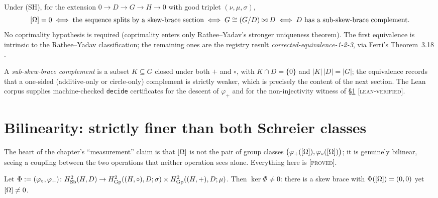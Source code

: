 \begin{theorem}\label{thm:identify}
Under (SH), for the extension $0\to D\to G\to H\to0$ with good triplet
$(\nu,\mu,\sigma)$,
\[
  [\Omega]=0
  \iff \text{the sequence splits by a skew-brace section}
  \iff G\cong (G/D)\bowtie D
  \iff D \text{ has a sub-skew-brace complement.}
\]
No coprimality hypothesis is required (coprimality enters only Rathee--Yadav's
stronger uniqueness theorem). The first equivalence is intrinsic to the
Rathee--Yadav classification; the remaining ones are the registry result
\emph{corrected-equivalence-1-2-3}, via Ferri's Theorem~3.18 \cite{ferri-qsb}.
\end{theorem}

A \emph{sub-skew-brace complement} is a subset $K\subseteq G$ closed under both $+$
and $\circ$, with $K\cap D=\{0\}$ and $|K|\,|D|=|G|$; the equivalence records that a
one-sided (additive-only or circle-only) complement is strictly weaker, which is
precisely the content of the next section. The Lean corpus supplies machine-checked
\texttt{decide} certificates for the descent of $\varphi_+$ and for the
non-injectivity witness of \S\ref{sec:omega-bilinear} \textsc{[lean-verified]}.

\section{Bilinearity: strictly finer than both Schreier classes}\label{sec:omega-bilinear}

The heart of the chapter's ``measurement'' claim is that $[\Omega]$ is not the pair of
group classes $\bigl(\varphi_+([\Omega]),\varphi_\circ([\Omega])\bigr)$; it is genuinely
bilinear, seeing a coupling between the two operations that neither operation sees
alone. Everything here is \textsc{[proved]}.

\begin{theorem}\label{thm:W4}
Let $\Phi:=(\varphi_\circ,\varphi_+)\colon
H^2_{\mathrm{Sb}}(H,D)\to
H^2_{\mathrm{Gp}}((H,\circ),D;\sigma)\times H^2_{\mathrm{Gp}}((H,+),D;\mu)$.
Then $\ker\Phi\neq0$: there is a skew brace with $\Phi([\Omega])=(0,0)$ yet $[\Omega]\neq0$.
\end{theorem}

